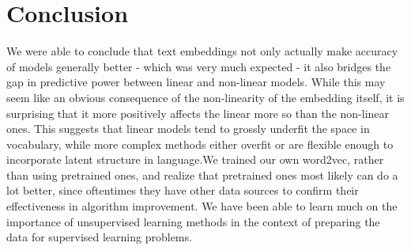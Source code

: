 \documentclass[letterpaper, 12 pt, conference]{ieeeconf}  %
\begin{document}
\section{Conclusion}
We were able to conclude that text embeddings not only actually make accuracy of models generally better - which was very much expected - it also bridges the gap in predictive power between linear and non-linear models. While this may seem like an obvious consequence of the non-linearity of the embedding itself, it is surprising that it more positively affects the linear more so than the non-linear ones. This suggests that linear models tend to grossly underfit the space in vocabulary, while more complex methods either overfit or are flexible enough to incorporate latent structure in language.We trained our own word2vec, rather than using pretrained ones, and realize that pretrained ones most likely can do a lot better, since oftentimes they have other data sources to confirm their effectiveness in algorithm improvement. We have been able to learn much on the importance of unsupervised learning methods in the context of preparing the data for supervised learning problems. 
\end{document}
